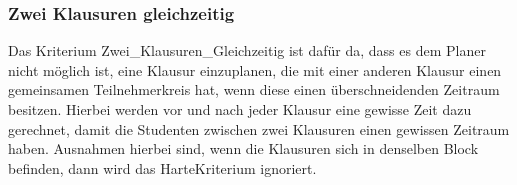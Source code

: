 \subsubsection{Zwei Klausuren gleichzeitig}
Das Kriterium Zwei\_Klausuren\_Gleichzeitig ist dafür da, dass es dem Planer nicht möglich ist,
eine Klausur einzuplanen, die mit einer anderen Klausur einen gemeinsamen Teilnehmerkreis hat,
wenn diese einen überschneidenden Zeitraum besitzen.
Hierbei werden vor und nach jeder Klausur eine gewisse Zeit dazu gerechnet, damit die Studenten
zwischen zwei Klausuren einen gewissen Zeitraum haben.
Ausnahmen hierbei sind, wenn die Klausuren sich in denselben Block befinden, dann wird das HarteKriterium ignoriert.
